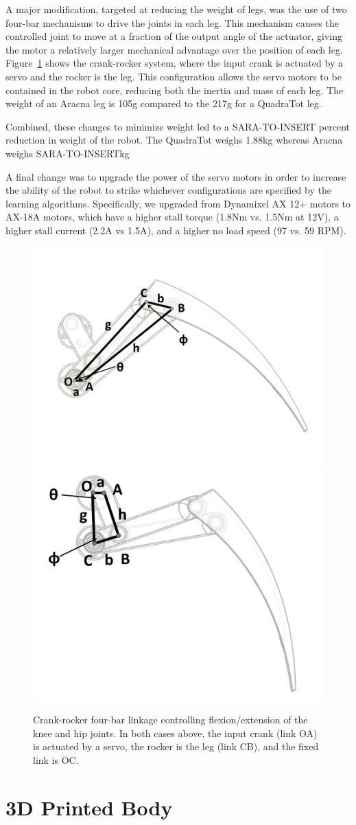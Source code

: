 \documentclass[letterpaper]{article}
\begin{document}
A major modification, targeted at reducing the weight of legs, was the use of two four-bar mechanisms to drive the joints in each
leg. This mechanism causes the controlled joint to move at a fraction
of the output angle of the actuator, giving the motor a relatively
larger mechanical advantage over the position of each leg.
Figure~\ref{crankRocker} shows the crank-rocker system, where the input crank
is actuated by a servo and the rocker is the leg. This
configuration allows the servo motors to be contained in the robot core, reducing both the inertia and mass of each leg. The weight of an Aracna leg is 105g compared to the 217g for a QuadraTot leg.  

Combined, these changes to minimize weight led to a SARA-TO-INSERT percent reduction in weight of the robot. The QuadraTot weighs 1.88kg whereas Aracna weighs SARA-TO-INSERTkg

A final change was to upgrade the power of the servo motors in order to increase the ability of the robot to strike whichever configurations are specified by the learning algorithms. Specifically, we upgraded from Dynamixel AX 12+ motors to AX-18A motors, which have a higher stall torque (1.8Nm vs. 1.5Nm at 12V), a higher stall current (2.2A vs 1.5A), and a higher no load speed (97 vs. 59 RPM).


\begin{figure}[t]
\begin{center}
\includegraphics[width=.23\textwidth]{fig3.pdf}
\includegraphics[width=.23\textwidth]{fig4.pdf}
\caption{Crank-rocker four-bar linkage controlling flexion/extension of
  the knee and hip joints. In both cases above, the input crank (link
  OA) is actuated by a servo, the rocker is the leg (link CB), and the
  fixed link is OC.}
\label{crankRocker}
\end{center}
\end{figure}


\section{3D Printed Body}
\end{document}
